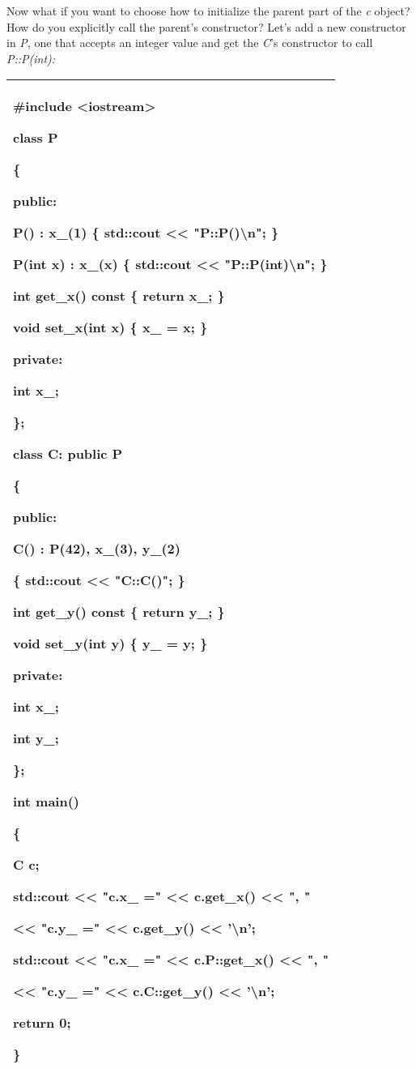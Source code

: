 \documentclass[
]{article}
\begin{document}
Now what if you want to choose how to initialize the parent part of the
\emph{c} object? How do you explicitly call the parent's constructor?
Let's add a new constructor in \emph{P}, one that accepts an integer
value and get the \emph{C}'s constructor to call \emph{P::P(int):}

\begin{longtable}[]{@{}l@{}}
\toprule
\endhead
\begin{minipage}[t]{0.97\columnwidth}\raggedright
\#include \textless iostream\textgreater{}

class P

\{

public:

P() : x\_(1) \{ std::cout \textless\textless{} "P::P()\textbackslash n";
\}

\textbf{P(int x) : x\_(x) \{ std::cout \textless\textless{}
"P::P(int)\textbackslash n"; \}}

int get\_x() const \{ return x\_; \}

void set\_x(int x) \{ x\_ = x; \}

private:

int x\_;

\};

class C: public P

\{

public:

C() : \textbf{P(42),} x\_(3), y\_(2)

\{ std::cout \textless\textless{} "C::C()"; \}

int get\_y() const \{ return y\_; \}

void set\_y(int y) \{ y\_ = y; \}

private:

int x\_;

int y\_;

\};

int main()

\{

C c;

std::cout \textless\textless{} "c.x\_ =" \textless\textless{} c.get\_x()
\textless\textless{} ", "

\textless\textless{} "c.y\_ =" \textless\textless{} c.get\_y()
\textless\textless{} '\textbackslash n';

std::cout \textless\textless{} "c.x\_ =" \textless\textless{}
c.P::get\_x() \textless\textless{} ", "

\textless\textless{} "c.y\_ =" \textless\textless{} c.C::get\_y()
\textless\textless{} '\textbackslash n';

return 0;

\}\strut
\end{minipage}\tabularnewline
\bottomrule
\end{longtable}
\end{document}
